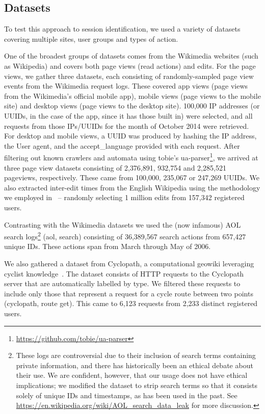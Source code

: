\subsection{Datasets}
To test this approach to session identification, we used a variety of datasets covering multiple sites, user groups and types of action.

 One of the broadest groups of datasets comes from the Wikimedia websites (such as Wikipedia) and covers both page views (read actions) and edits. For the page views, we gather three datasets, each consisting of randomly-sampled page view events from the Wikimedia request logs. These covered app views (page views from the Wikimedia's official mobile app), mobile views (page views to the mobile site) and desktop views (page views to the desktop site). 100,000 IP addresses (or UUIDs, in the case of the app, since it has those built in) were selected, and all requests from those IPs/UUIDs for the month of October 2014 were retrieved. For desktop and mobile views, a UUID was produced by hashing the IP address, the User agent, and the accept\_language provided with each request. After filtering out known crawlers and automata using tobie's ua-parser\footnote{\url{https://github.com/tobie/ua-parser}}, we arrived at three page view datasets consisting of 2,376,891, 932,754 and 2,285,521 pageviews, respectively. These came from 100,000, 235,067 or 247,269 UUIDs. We also extracted inter-edit times from the English Wikipedia using the methodology we employed in~\cite{geiger2013using} -- randomly selecting 1 million edits from 157,342 registered users.

 Contrasting with the Wikimedia datasets we used the (now infamous) AOL search logs\footnote{These logs are controversial due to their inclusion of search terms containing private information, and there has historically been an ethical debate about their use. We are confident, however, that our usage does not have ethical implications; we modified the dataset to strip search terms so that it consists solely of unique IDs and timestamps, as has been used in the past.\cite{mehrzadi2012onextracting}  See \url{https://en.wikipedia.org/wiki/AOL_search_data_leak} for more discussion.} (aol, search) consisting of 36,389,567 search actions from 657,427 unique IDs. These actions span from March through May of 2006.

 We also gathered a dataset from Cyclopath, a computational geowiki leveraging cyclist knowledge~\cite{priedhorsky2008computational}.  The dataset consists of HTTP requests to the Cyclopath server that are automatically labelled by type.  We filtered these requests to include only those that represent a request for a cycle route between two points (cyclopath, route get). This came to 6,123 requests from 2,233 distinct registered users.

